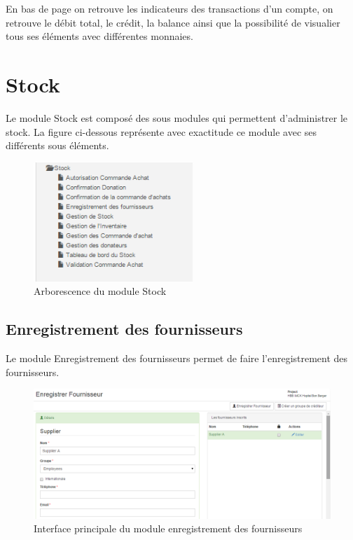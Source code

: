 \documentclass[12pt,a4paper]{report}
\begin{document}
En bas de page on retrouve les indicateurs des transactions d'un compte, on retrouve le débit total, le crédit, la balance ainsi que la possibilité de visualier tous ses éléments avec différentes monnaies. 


\newpage
\chapter{Stock}        
Le module Stock est composé des sous modules qui permettent d'administrer le stock. La figure ci-dessous représente avec exactitude ce module avec ses différents sous éléments.

\begin{figure}[h]
\begin{center}
\includegraphics[width=6cm]{pic/StockManagement.png}
\end{center}
\caption{Arborescence du module Stock}
\label{Arborescence du module Stock}
\end{figure}


\section{Enregistrement des fournisseurs}
Le module Enregistrement des fournisseurs permet de faire l'enregistrement des fournisseurs.

\begin{figure}[h]
\begin{center}
\includegraphics[width=14cm]{pic/InterEnrFourn.png}
\end{center}
\caption{Interface principale du module enregistrement des fournisseurs}
\label{Interface principale du module enregistrement des fournisseurs}
\end{figure}
\end{document}
